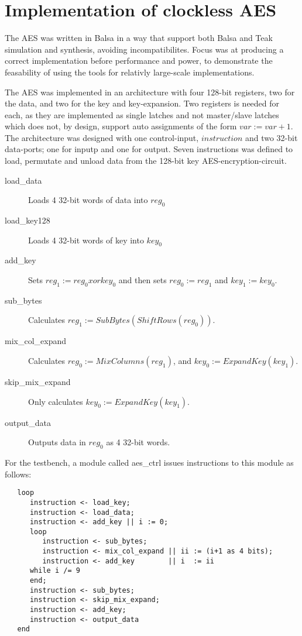 \section{Implementation of clockless AES}

The AES was written in Balsa in a way that support both Balsa and
Teak simulation and synthesis, avoiding incompatibilites. Focus was at
producing a correct implementation before performance and power, to
demonstrate the feasability of using the tools for relativly
large-scale implementations.

The AES was implemented in an architecture with four 128-bit
registers, two for the data, and two for the key and
key-expansion. Two registers is needed for each, as they are
implemented as single latches and not master/slave latches which does
not, by design, support auto assignments of the form $var := var +
1$. The architecture was designed with one control-input,
$instruction$ and two 32-bit data-ports; one for inputp and one for
output. Seven instructions was defined to load, permutate and unload
data from the 128-bit key AES-encryption-circuit.
\begin{description}
  \item[load_data]{Loads 4 32-bit words of data into $reg_0$}
  \item[load_key128]{Loads 4 32-bit words of key into $key_0$}
  \item[add_key]{Sets $reg_1 := reg_0 xor key_0$ and then sets $reg_0
    := reg_1$ and $key_1 := key_0$.}
  \item[sub_bytes]{Calculates $reg_1 := SubBytes(ShiftRows(reg_0))$.}
  \item[mix_col_expand]{Calculates $reg_0 := MixColumns(reg_1)$, and
    $key_0 := ExpandKey(key_1)$.}
  \item[skip_mix_expand]{Only calculates $key_0 := ExpandKey(key_1)$.}
  \item[output_data]{Outputs data in $reg_0$ as 4 32-bit words}.
\end{description}

For the testbench, a module called aes_ctrl issues instructions to
this module as follows:
\begin{verbatim}
   loop
      instruction <- load_key;
      instruction <- load_data;
      instruction <- add_key || i := 0;
      loop
         instruction <- sub_bytes;
         instruction <- mix_col_expand || ii := (i+1 as 4 bits);
         instruction <- add_key        || i  := ii
      while i /= 9
      end;
      instruction <- sub_bytes;
      instruction <- skip_mix_expand;
      instruction <- add_key;
      instruction <- output_data
   end
\end{verbatim}


